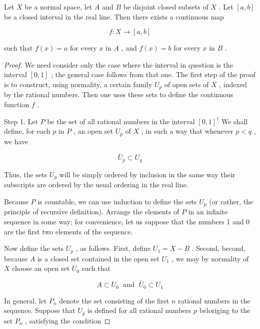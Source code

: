 \begin{theorem}
	Let \(X\) be a normal space, let \(A\) and \(B\) be disjoint closed subsets of \(X\) . Let \(\left\lbrack  {a,b}\right\rbrack\) be a closed interval in the real line. Then there exists a continuous map

\[
f : X \rightarrow  \left\lbrack  {a,b}\right\rbrack
\]

such that \(f\left( x\right)  = a\) for every \(x\) in \(A\) , and \(f\left( x\right)  = b\) for every \(x\) in \(B\) .

\end{theorem}
\begin{proof}
We need consider only the case where the interval in question is the interval \(\left\lbrack  {0,1}\right\rbrack\) ; the general case follows from that one. The first step of the proof is to construct, using normality, a certain family \({U}_{p}\) of open sets of \(X\) , indexed by the rational numbers. Then one uses these sets to define the continuous function \(f\) .

Step 1. Let \(P\) be the set of all rational numbers in the interval \(\left\lbrack  0,1\right\rbrack ^{\dagger}\) We shall define, for each \(p\) in \(P\) , an open set \({U}_{p}\) of \(X\) , in such a way that whenever \(p < q\) , we have

\[
{\bar{U}}_{p} \subset  {U}_{q}
\]

Thus, the sets \({U}_{p}\) will be simply ordered by inclusion in the same way their subscripts are ordered by the usual ordering in the real line.

Because \(P\) is countable, we can use induction to define the sets \({U}_{p}\) (or rather, the principle of recursive definition). Arrange the elements of \(P\) in an infinite sequence in some way; for convenience, let us suppose that the numbers 1 and 0 are the first two elements of the sequence.

Now define the sets \({U}_{p}\) , as follows. First, define \({U}_{1} = X - B\) . Second, becond, because \(A\) is a closed set contained in the open set \({U}_{1}\) , we may by normality of \(X\) choose an open set \({U}_{0}\) such that

\[
A \subset  {U}_{0}\;\text{ and }\;{\bar{U}}_{0} \subset  {U}_{1}
\]

In general, let \({P}_{n}\) denote the set consisting of the first \(n\) rational numbers in the sequence. Suppose that \({U}_{p}\) is defined for all rational numbers \(p\) beloriging to the set \({P}_{n}\) , satisfying the condition


\end{proof}
